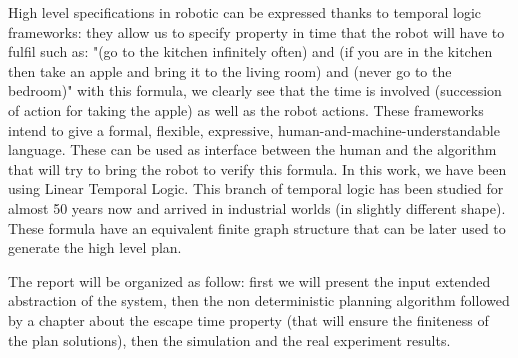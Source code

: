 High level specifications in robotic can be expressed thanks to temporal logic frameworks: they allow us to specify property in time that the robot will have to fulfil such as: "(go to the kitchen infinitely often) and (if you are in the kitchen then take an apple and bring it to the living room) and (never go to the bedroom)" with this formula, we clearly see that the time is involved (succession of action for taking the apple) as well as the robot actions.
These frameworks intend to give a formal, flexible, expressive, human-and-machine-understandable language. These can be used as interface between the human and the algorithm that will try to bring the robot to verify this formula.
In this work, we have been using Linear Temporal Logic. This branch of temporal logic has been studied for almost 50 years now and arrived in industrial worlds (in slightly different shape).
These formula have an equivalent finite graph structure that can be later used to generate the high level plan.

The report will be organized as follow: first we will present the input extended abstraction of the system, then the non deterministic planning algorithm followed by a chapter about the escape time property (that will ensure the finiteness of the plan solutions), then the simulation and the real experiment results.


